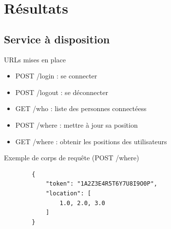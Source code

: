 \documentclass{beamer} %
\begin{document}
  \section{Résultats}
  \subsection{Service à disposition}
  \begin{frame}[fragile]{\subsecname}

    \begin{block}{URLs mises en place}
      \begin{itemize}
        \item POST /login : se connecter
        \item POST /logout : se déconnecter
        \item GET /who : liste des personnes connectéess
        \item POST /where : mettre à jour sa position
        \item GET /where : obtenir les positions des utilisateurs
      \end{itemize}
    \end{block}

    \pause

    \begin{exampleblock}{Exemple de corps de requête (POST /where)}
      \begin{verbatim}
        {
            "token": "1A2Z3E4R5T6Y7U8I9O0P",
            "location": [
                1.0, 2.0, 3.0
            ]
        }
      \end{verbatim}
    \end{exampleblock}

\end{frame}
\end{document}
